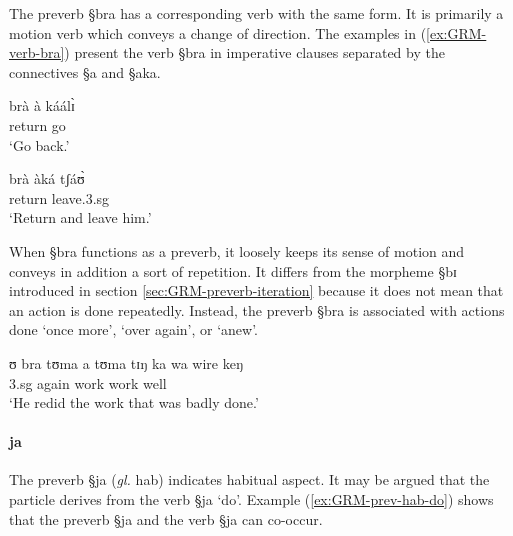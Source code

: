 The preverb {\S bra} has a corresponding verb with the same form. It is
primarily a motion verb which conveys a change of direction. The examples 
in (\ref{ex:GRM-verb-bra}) present the verb {\S bra} in imperative clauses
separated by the connectives {\S a} and {\S aka}.


\begin{exe}
\ex\label{ex:GRM-verb-bra}
\begin{xlist}
\ex
\gll brà à káálɪ̀\\
return {\conn} go\\
\glt `Go back.'

\ex
\gll brà àká tʃáʊ̀\\
return {\conn} leave.{\sc 3.sg}\\
\glt `Return and leave him.'
\end{xlist}
\end{exe}


When {\S bra} functions as a preverb, it loosely keeps its sense of motion and
conveys in addition a sort of repetition. It differs from the morpheme {\S bɪ}
introduced in
 section \ref{sec:GRM-preverb-iteration} because it does not mean that an
action is
done
repeatedly.  Instead, the preverb {\S bra} is associated with actions done `once
more', `over again',  or `anew'.


\begin{exe}
\ex\label{ex:vp33.1.}
\gll ʊ bra tʊma a tʊma tɪŋ ka wa wire keŋ \\
 {\sc 3.sg}  {again}  {work} {\art} {work}   {\art} {\egr} {\neg} well {\advm}\\
\glt  `He redid the work that was 
 badly done.'
\end{exe}





\paragraph{ja}
\label{sec:GRM-preverb-hab}

The preverb {\S ja} ({\it gl.} {\sc hab})  indicates habitual aspect. It may be
argued that the
particle derives from the  verb {\S ja} `do'. Example
(\ref{ex:GRM-prev-hab-do}) shows that the preverb {\S ja} and the verb {\S ja}
can
co-occur. 


